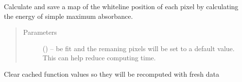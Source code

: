\documentclass[letterpaper,10pt,english]{sphinxmanual}
\begin{document}
\begin{fulllineitems}
\begin{fulllineitems}
\end{fulllineitems}


\begin{fulllineitems}
\label{\detokenize{xanespy:xanespy.xanes_frameset.XanesFrameset.calculate_whitelines}}
Calculate and save a map of the whiteline position of each pixel by
calculating the energy of simple maximum absorbance.
\begin{quote}\begin{description}
\item[{Parameters}] \leavevmode
{} (\sphinxstyleliteralemphasis{-}) -- be fit and the remaning pixels will be set to a default
value. This can help reduce computing time.

\end{description}\end{quote}

\end{fulllineitems}


\begin{fulllineitems}
\label{\detokenize{xanespy:xanespy.xanes_frameset.XanesFrameset.clear_caches}}
Clear cached function values so they will be recomputed with fresh
data

\end{fulllineitems}


\begin{fulllineitems}
\label{\detokenize{xanespy:xanespy.xanes_frameset.XanesFrameset.cmap}}
\end{fulllineitems}


\begin{fulllineitems}
\label{\detokenize{xanespy:xanespy.xanes_frameset.XanesFrameset.data_name}}
\end{fulllineitems}



\end{fulllineitems}
\end{document}
